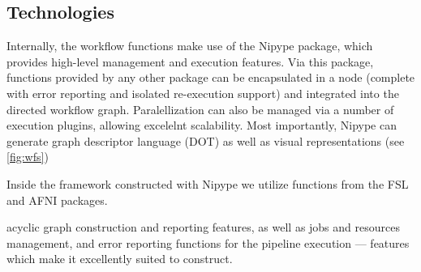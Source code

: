 \subsection{Technologies}

Internally, the workflow functions make use of the Nipype \cite{nipype} package, which provides high-level management and execution features.
Via this package, functions provided by any other package can be encapsulated in a node (complete with error reporting and isolated re-execution support) and integrated into the directed workflow graph.
Paralellization can also be managed via a number of execution plugins, allowing excelelnt scalability.
Most importantly, Nipype can generate graph descriptor language (DOT) as well as visual representations (see \cref{fig:wfs})

Inside the framework constructed with Nipype we utilize functions from the FSL and AFNI packages.

acyclic graph construction and reporting features, as well as jobs and resources management, and error reporting functions for the pipeline execution --- features which make it excellently suited to construct. 

